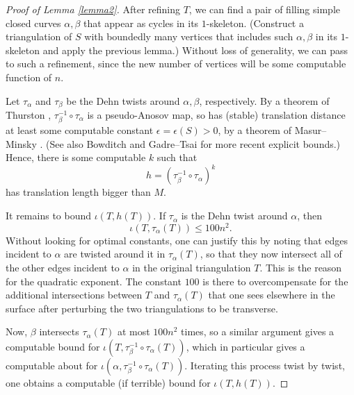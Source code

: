 \documentclass[11pt]{amsart}
\theoremstyle{remark}
\numberwithin{equation}{section}
\begin{document}
 \begin {proof}[Proof of Lemma \ref{lemma2}]
 	After refining $T$, we can find a pair of filling simple closed curves $\alpha,\beta$ that appear as cycles in its $1$-skeleton. (Construct a triangulation of $S$ with boundedly many vertices that includes such $\alpha,\beta$ in its $1$-skeleton and apply the previous lemma.)   Without loss of generality, we can pass to such a refinement, since the new number of vertices will be some computable function of $n$.


 Let $\tau_\alpha$ and $\tau_\beta$  be the Dehn twists  around $\alpha,\beta$,  respectively. By a theorem of Thurston \cite{Fathitravaux}, $\tau_\beta^{-1} \circ \tau_\alpha$  is a pseudo-Anosov map, so has (stable) translation distance at least some computable constant $\epsilon=\epsilon(S)>0$, by a theorem of Masur--Minsky \cite[Prop 2.1]{Masurgeometry2}. (See also Bowditch \cite{bowditch2008tight} and Gadre--Tsai \cite{gadre2011minimal} for more recent explicit bounds.) Hence, there is some computable $k$ such that $$h=(\tau_\beta^{-1} \circ \tau_\alpha)^k$$ has translation length bigger than $M$.

 It remains to bound $\iota(T,h(T))$.
If $\tau_\alpha$  is the Dehn twist around $\alpha$, then $$\iota(T,\tau_\alpha(T)) \leq 100 n^2.$$ Without looking for optimal constants, one can justify this by  noting that edges incident to $\alpha$ are twisted around it in $\tau_\alpha(T)$, so that they now intersect all of the other edges incident to $\alpha$ in the original triangulation $T$. This is the reason for the quadratic exponent. The constant $100$ is there to overcompensate for the additional intersections between $T$ and $\tau_\alpha(T)$ that one sees elsewhere in the surface after perturbing the two triangulations to be transverse.

Now, $\beta$ intersects $\tau_\alpha(T)$ at most $100n^2$ times, so a similar argument gives a computable bound for $\iota(T,\tau_\beta^{-1} \circ \tau_\alpha(T))$, which in particular gives a computable about for $\iota(\alpha,\tau_\beta^{-1} \circ \tau_\alpha(T))$.   Iterating  this process twist by twist, one obtains a computable (if terrible) bound for $\iota(T,h(T))$. \end {proof}
\end{document}
